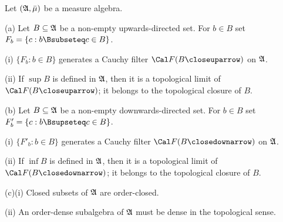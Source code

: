
 Let $(\frak A,\bar\mu)$ be a measure algebra.

(a) Let $B\subseteq\frak A$ be a non-empty upwards-directed set.   For
$b\in B$ set $F_b=\{c:b\Bsubseteq c\in B\}$.

\quad (i) $\{F_b:b\in B\}$ generates a Cauchy filter
$\Cal F(B\closeuparrow)$ on $\frak A$.

\quad (ii) If $\sup B$ is defined in $\frak A$, then it is a
topological limit of $\Cal F(B\closeuparrow)$;  
it belongs to the topological closure of $B$.

(b) Let $B\subseteq\frak A$ be a non-empty downwards-directed set.   For
$b\in B$ set $F'_b=\{c:b\Bsupseteq c\in B\}$.

\quad (i) $\{F'_b:b\in B\}$ generates a Cauchy filter
$\Cal F(B\closedownarrow)$ on $\frak A$.

\quad (ii) If $\inf B$ is defined in $\frak A$, then it is a
topological limit of $\Cal F(B\closedownarrow)$;   it
belongs to the topological closure of $B$.

(c)(i) Closed subsets of $\frak A$ are order-closed.

\quad (ii) An order-dense subalgebra of $\frak A$ must be dense in the
topological sense.

